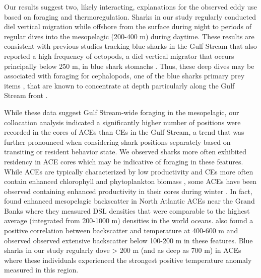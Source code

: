 
Our results suggest two, likely interacting, explanations for the observed eddy use based on foraging and thermoregulation. Sharks in our study regularly conducted diel vertical migration while offshore from the surface during night to periods of regular dives into the mesopelagic (200-400 m) during daytime. These results are consistent with previous studies tracking blue sharks in the Gulf Stream that also reported a high frequency of octopods, a diel vertical migrator that occurs principally below 250 m, in blue shark stomachs \citep{Carey1990}. Thus, these deep dives may be associated with foraging for cephalopods, one of the blue sharks primary prey items \citep{Clarke1974, Henderson2001}, that are known to concentrate at depth particularly along the Gulf Stream front \citep{Vovk1978, Fedulov1986, Dawe1985}. 

While these data suggest Gulf Stream-wide foraging in the mesopelagic, our collocation analysis indicated a significantly higher number of positions were recorded in the cores of ACEs than CEs in the Gulf Stream, a trend that was further pronounced when considering shark positions separately based on transiting or resident behavior state. We observed sharks more often exhibited residency in ACE cores which may be indicative of foraging \citep{Breed2009} in these features. While ACEs are typically characterized by low productivity and CEs more often contain enhanced chlorophyll and phytoplankton biomass \citep{Gaube2017DSR}, some ACEs have been observed containing enhanced productivity in their cores during winter \citep{Dufois2016}. In fact, \cite{Fennell2015} found enhanced mesopelagic backscatter in North Atlantic ACEs near the Grand Banks where they measured DSL densities that were comparable to the highest average (integrated from 200-1000 m) densities in the world oceans. \cite{Fennell2015} also found a positive correlation between backscatter and temperature at 400-600 m and observed observed extensive backscatter below 100-200 m in these features. Blue sharks in our study regularly dove > 200 m (and as deep as 700 m) in ACEs where these individuals experienced the strongest positive temperature anomaly measured in this region.

